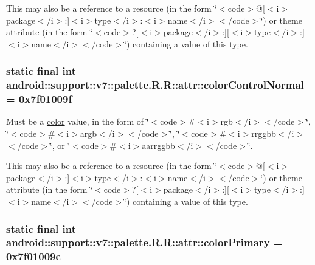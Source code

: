 This may also be a reference to a resource (in the form \char`\"{}$<$code$>$@\mbox{[}$<$i$>$package$<$/i$>$:\mbox{]}$<$i$>$type$<$/i$>$:$<$i$>$name$<$/i$>$$<$/code$>$\char`\"{}) or theme attribute (in the form \char`\"{}$<$code$>$?\mbox{[}$<$i$>$package$<$/i$>$:\mbox{]}\mbox{[}$<$i$>$type$<$/i$>$:\mbox{]}$<$i$>$name$<$/i$>$$<$/code$>$\char`\"{}) containing a value of this type. \hypertarget{classandroid_1_1support_1_1v7_1_1palette_1_1_r_1_1attr_35dffafb36462db4ee22e954f434aed5}{
\subsubsection[{colorControlNormal}]{\setlength{\rightskip}{0pt plus 5cm}static final int android::support::v7::palette.R.R::attr::colorControlNormal = 0x7f01009f}}
\label{classandroid_1_1support_1_1v7_1_1palette_1_1_r_1_1attr_35dffafb36462db4ee22e954f434aed5}


Must be a \hyperlink{classandroid_1_1support_1_1v7_1_1palette_1_1_r_1_1color}{color} value, in the form of \char`\"{}$<$code$>$\#$<$i$>$rgb$<$/i$>$$<$/code$>$\char`\"{}, \char`\"{}$<$code$>$\#$<$i$>$argb$<$/i$>$$<$/code$>$\char`\"{}, \char`\"{}$<$code$>$\#$<$i$>$rrggbb$<$/i$>$$<$/code$>$\char`\"{}, or \char`\"{}$<$code$>$\#$<$i$>$aarrggbb$<$/i$>$$<$/code$>$\char`\"{}. 

This may also be a reference to a resource (in the form \char`\"{}$<$code$>$@\mbox{[}$<$i$>$package$<$/i$>$:\mbox{]}$<$i$>$type$<$/i$>$:$<$i$>$name$<$/i$>$$<$/code$>$\char`\"{}) or theme attribute (in the form \char`\"{}$<$code$>$?\mbox{[}$<$i$>$package$<$/i$>$:\mbox{]}\mbox{[}$<$i$>$type$<$/i$>$:\mbox{]}$<$i$>$name$<$/i$>$$<$/code$>$\char`\"{}) containing a value of this type. \hypertarget{classandroid_1_1support_1_1v7_1_1palette_1_1_r_1_1attr_ec1d59ac07d268f5fa695c7aabebc079}{
\subsubsection[{colorPrimary}]{\setlength{\rightskip}{0pt plus 5cm}static final int android::support::v7::palette.R.R::attr::colorPrimary = 0x7f01009c}}
\label{classandroid_1_1support_1_1v7_1_1palette_1_1_r_1_1attr_ec1d59ac07d268f5fa695c7aabebc079}


